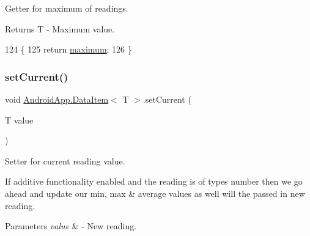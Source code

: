 Getter for maximum of readings. 

\begin{DoxyReturn}{Returns}
T -\/ Maximum value. 
\end{DoxyReturn}

\begin{DoxyCode}
124                           \{
125         \textcolor{keywordflow}{return} \hyperlink{class_android_app_1_1_data_item_a6e53719b27d08f889c4d6460254583dc}{maximum};
126     \}
\end{DoxyCode}
\mbox{\label{class_android_app_1_1_data_item_a6cd8975067d5be2d5eaac137a94c0eac}} 
\subsubsection{\texorpdfstring{set\+Current()}{setCurrent()}}
{\footnotesize\ttfamily void \hyperlink{class_android_app_1_1_data_item}{Android\+App.\+Data\+Item}$<$ T $>$.set\+Current (\begin{DoxyParamCaption}\item[{T}]{value }\end{DoxyParamCaption})\hspace{0.3cm}{\ttfamily [inline]}}



Setter for current reading value. 

If additive functionality enabled and the reading is of types number then we go ahead and update our min, max \& average values as well will the passed in new reading.


\begin{DoxyParams}{Parameters}
{\em value} & -\/ New reading. \\
\hline
\end{DoxyParams}

